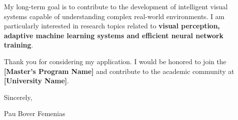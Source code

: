 \documentclass[11pt,a4paper]{letter}
\newcommand{\ApplicantName}{Pau Bover Femenias}
\newcommand{\University}{[University Name]}
\newcommand{\Program}{[Master’s Program Name]}
\begin{document}
My long-term goal is to contribute to the development of intelligent visual systems capable of understanding complex real-world environments. I am particularly interested in research topics related to \textbf{visual perception, adaptive machine learning systems and efficient neural network training}.

Thank you for considering my application. I would be honored to join the \textbf{\Program} and contribute to the academic community at \textbf{\University}.

\vspace{15pt}

Sincerely,

\vspace{15pt}

\ApplicantName
\end{document}
